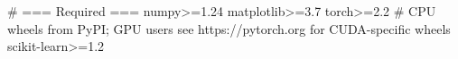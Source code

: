 # === Required ===
numpy>=1.24
matplotlib>=3.7
torch>=2.2   # CPU wheels from PyPI; GPU users see https://pytorch.org for CUDA-specific wheels
scikit-learn>=1.2